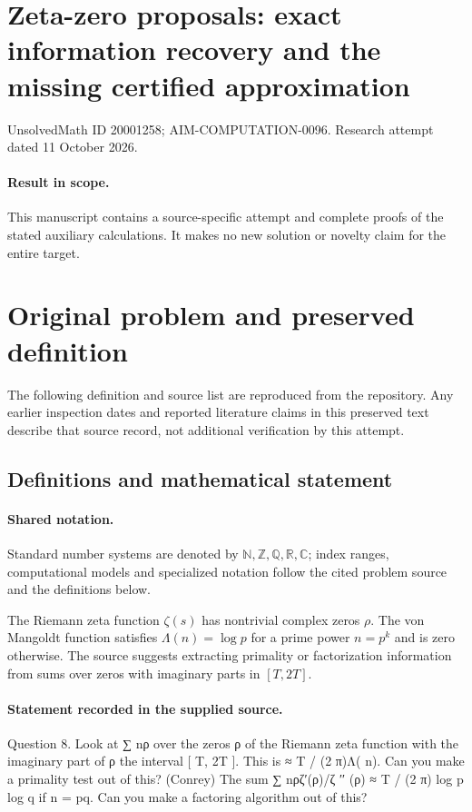 \documentclass[11pt]{article}
\begin{document}
\section*{Zeta-zero proposals: exact information recovery and the missing certified approximation}
\noindent UnsolvedMath ID 20001258; AIM-COMPUTATION-0096. Research attempt dated 11 October 2026.
\paragraph{Result in scope.}This manuscript contains a source-specific attempt and complete proofs of the stated auxiliary calculations. It makes no new solution or novelty claim for the entire target.
\section{Original problem and preserved definition}
The following definition and source list are reproduced from the repository. Any earlier inspection dates and reported literature claims in this preserved text describe that source record, not additional verification by this attempt.
\subsection{Definitions and mathematical statement}

\paragraph{Shared notation.}Standard number systems are denoted by $\mathbb N,\mathbb Z,\mathbb Q,\mathbb R,\mathbb C$; index ranges, computational models and specialized notation follow the cited problem source and the definitions below.


The Riemann zeta function $\zeta(s)$ has nontrivial complex zeros $\rho$. The von Mangoldt function satisfies $\Lambda(n)=\log p$ for a prime power $n=p^k$ and is zero otherwise. The source suggests extracting primality or factorization information from sums over zeros with imaginary parts in $[T,2T]$.
\paragraph{Statement recorded in the supplied source.}
Question 8. Look at ∑ nρ over the zeros ρ of the Riemann zeta function with the imaginary part of ρ the interval [ T, 2T ]. This is ≈ T / (2 π)Λ( n). Can you make a primality test out of this? (Conrey) The sum ∑ nρζ′(ρ)/ζ ′′ (ρ) ≈ T / (2 π) log p log q if n = pq. Can you make a factoring algorithm out of this?
\end{document}
